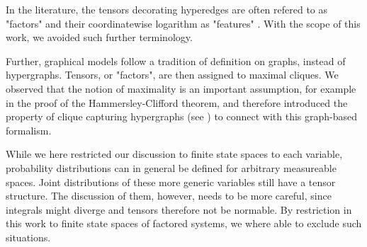 In the literature, the tensors decorating hyperedges are often refered to as "factors" and their coordinatewise logarithm as "features" \cite{koller_probabilistic_2009}.
With the scope of this work, we avoided such further terminology.

Further, graphical models follow a tradition of definition on graphs, instead of hypergraphs.
Tensors, or "factors", are then assigned to maximal cliques.
We observed that the notion of maximality is an important assumption, for example in the proof of the Hammersley-Clifford theorem, and therefore introduced the property of clique capturing hypergraphs (see ) to connect with this graph-based formalism.

While we here restricted our discussion to finite state spaces to each variable, probability distributions can in general be defined for arbitrary measureable spaces.
Joint distributions of these more generic variables still have a tensor structure.
The discussion of them, however, needs to be more careful, since integrals might diverge and tensors therefore not be normable.
By restriction in this work to finite state spaces of factored systems, we where able to exclude such situations.








